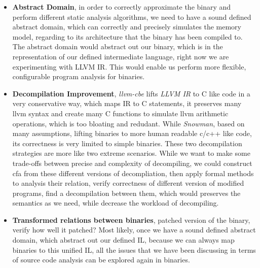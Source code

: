 \documentclass{article}
\begin{document}
\begin{itemize}
      \item
        \textbf{Abstract Domain}, in order to correctly approximate the binary and perform different static analysis algorithms, we need to have a sound defined abstract domain, which can correctly and precisely simulates the memory model, regarding to its architecture that the binary has been compiled to. The abstract domain would abstract out our binary, which is in the representation of our defined intermediate language, right now we are experimenting with LLVM IR. This would enable us perform more flexible, configurable program analysis for binaries.

      \item
        \textbf{Decompilation Improvement}, \emph{llvm-cbe} lifts \emph{LLVM IR} to C like code in a very conservative way, which maps IR to C statements, it preserves many llvm syntax and create many C functions to simulate llvm arithmetic operations, which is too bloating and redudant. While \emph{Snowman}, based on many assumptions, lifting binaries to more human readable c/c++ like code, its correctness is very limited to simple binaries. These two decompilation strategies are more like two extreme scenarios. While we want to make some trade-offs between precise and complexity of decompiling, we could construct cfa from these different versions of decompliation, then apply formal methods to analysis their relation, verify correctness of different version of modified programs, find a decompilation between them, which would preserves the semantics as we need, while decrease the workload of decompiling.

      \item
        \textbf{Transformed relations between binaries}, patched version of the binary, verify how well it patched? Most likely, once we have a sound defined abstract domain, which abstract out our defined IL, because we can always map binaries to this unified IL, all the issues that we have been discussing in terms of source code analysis can be explored again in binaries.
\end{itemize}

\printbibliography[title=References]
\end{document}
